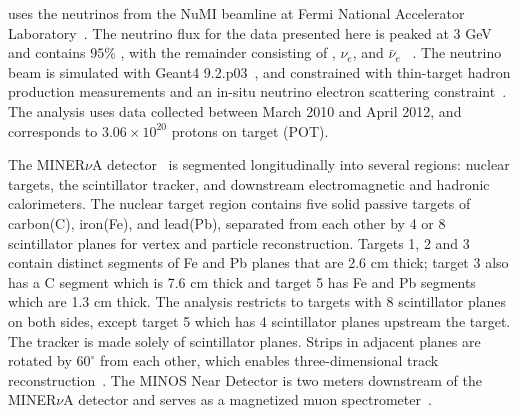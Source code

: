 
 \minerva uses the neutrinos from the NuMI beamline at Fermi National Accelerator Laboratory~\cite{Adamson:2015dkw}. 
The neutrino flux for the data presented here is peaked at 3 GeV and contains $95\%$ \numu, with the remainder consisting of \numubar, $\nu_e$, and $\bar\nu_e$ ~\cite{Alt:2006fr}. The neutrino beam is simulated with Geant4 9.2.p03~\cite{Agostinelli:2002hh}, and constrained with thin-target hadron production measurements and an in-situ neutrino electron scattering constraint~\cite{Aliaga:2016oaz}. The analysis uses data collected between March 2010 and April 2012, and corresponds to $3.06\times{10}^{20}$ protons on target (POT).

The MINER$\nu$A detector~\cite{Aliaga:2013uqz} is segmented longitudinally into several regions: nuclear targets, the scintillator tracker, and downstream electromagnetic and hadronic calorimeters. The nuclear target region contains five solid passive targets of carbon(C), iron(Fe), and lead(Pb), separated from each other by 4 or 8 scintillator planes for vertex and particle reconstruction. Targets 1, 2 and 3 contain distinct segments of Fe and Pb planes that are 2.6 cm thick; target 3 also has a C segment which is 7.6 cm thick and target 5 has Fe and Pb segments which are 1.3 cm thick. The analysis restricts to targets with 8 scintillator planes on both sides, except target 5 which has 4 scintillator planes upstream the target. The tracker is made solely of scintillator planes. Strips in adjacent planes are rotated by $60^{\circ}$ from each other, which enables three-dimensional track reconstruction~\cite{Aliaga:2013uqz}. The MINOS Near Detector is two meters downstream of the MINER$\nu$A detector and serves as a magnetized muon spectrometer~\cite{Michael:2008bc}.

